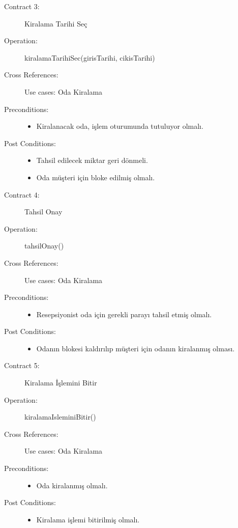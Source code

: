 \documentclass[12pt,a4paper]{report}
\begin{document}
\begin{description}
\item[Contract 3:] Kiralama Tarihi Seç
\item[Operation:] kiralamaTarihiSec(girisTarihi, cikisTarihi)
\item[Cross References:] Use cases: Oda Kiralama
\item[Preconditions:] \hspace{10 mm}
\begin{itemize}
\item Kiralanacak oda, işlem oturumunda tutuluyor olmalı.
\end{itemize}
\item[Post Conditions:] \hspace{10 mm}
\begin{itemize} 
\item Tahsil edilecek miktar geri dönmeli.
\item Oda müşteri için bloke edilmiş olmalı. \\
\end{itemize}
\end{description}

\begin{description}
\item[Contract 4:] Tahsil Onay
\item[Operation:] tahsilOnay()
\item[Cross References:] Use cases: Oda Kiralama
\item[Preconditions:] \hspace{10 mm}
\begin{itemize}
\item Resepsiyonist oda için gerekli parayı tahsil etmiş olmalı.
\end{itemize}
\item[Post Conditions:] \hspace{10 mm}
\begin{itemize} 
\item Odanın blokesi kaldırılıp müşteri için odanın kiralanmış olması. \\
\end{itemize}
\end{description}

\begin{description}
\item[Contract 5:] Kiralama İşlemini Bitir
\item[Operation:] kiralamaIsleminiBitir()
\item[Cross References:] Use cases: Oda Kiralama
\item[Preconditions:] \hspace{10 mm}
\begin{itemize}
\item Oda kiralanmış olmalı.
\end{itemize}
\item[Post Conditions:] \hspace{10 mm}
\begin{itemize} 
\item Kiralama işlemi bitirilmiş olmalı. \\
\end{itemize}
\end{description}
\end{document}
